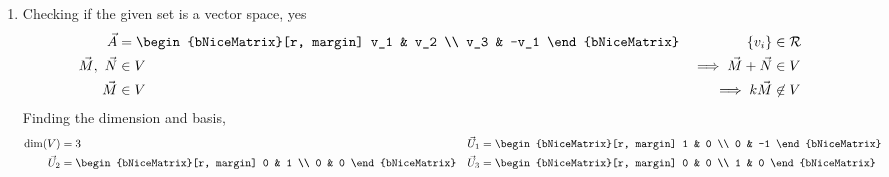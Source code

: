 \begin{enumerate}
    \item Checking if the given set is a vector space, \textcolor{y_h}{yes}
          \begin{align}
              \vec{A}                    & = \begin{bNiceMatrix}[r, margin]
                                                 v_1 & v_2 \\ v_3 & -v_1
                                             \end{bNiceMatrix} &
              \{v_i\}                    & \in \mathcal{R}                    \\
              \vec{M},\ \vec{N}          & \in V                            &
              \implies \vec{M} + \vec{N} & \in V                              \\
              \vec{M}                    & \in V                            &
              \implies k\vec{M}          & \not\in V
          \end{align}
          Finding the dimension and basis,
          \begin{align}
              \dim(V)   & = 3                              &
              \vec{U}_1 & = \begin{bNiceMatrix}[r, margin]
                                1 & 0 \\ 0 & -1
                            \end{bNiceMatrix}    \\
              \vec{U}_2 & = \begin{bNiceMatrix}[r, margin]
                                0 & 1 \\ 0 & 0
                            \end{bNiceMatrix} &
              \vec{U}_3 & = \begin{bNiceMatrix}[r, margin]
                                0 & 0 \\ 1 & 0
                            \end{bNiceMatrix}
          \end{align}


\end{enumerate}
